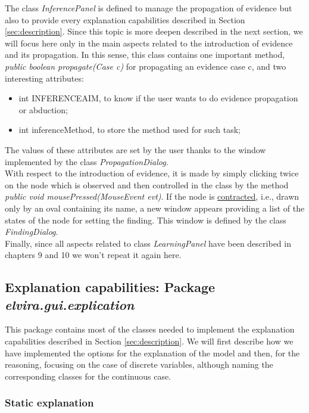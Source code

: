 The class \emph{InferencePanel} is defined to manage the
propagation of evidence but also to provide every explanation
capabilities described in Section \ref{sec:description}. Since
this topic is more deepen described in the next section, we will
focus here only in the main aspects related to the introduction of
evidence and its propagation. In this sense, this class contains
one important method, \emph{public boolean propagate(Case c)} for
propagating an evidence case c, and two interesting attributes:
\begin{itemize}
  \item int INFERENCEAIM, to know if the user wants to do evidence
  propagation or abduction;
  \item int inferenceMethod, to store the method used for such
  task;
\end{itemize}
The values of these attributes are set by the user thanks to the
window implemented by the class \emph{PropagationDialog}.\\

With respect to the introduction of evidence, it is made by simply
clicking twice on the node which is observed and then controlled
in the class by the method \emph{public void
mousePressed(MouseEvent evt)}. If the node is
\underline{contracted}, i.e., drawn only by an oval containing its
name, a new window appears providing a list of the states of the
node for setting the finding. This window is
defined by the class \emph{FindingDialog}.\\

Finally, since all aspects related to class \emph{LearningPanel}
have been described in chapters 9 and 10 we won't repeat it again
here.

\subsection{Explanation capabilities: Package \emph{elvira.gui.explication}}
\label{sec:impexplanation}

This package contains most of the classes needed to implement the
explanation capabilities described in Section
\ref{sec:description}. We will first describe how we have
implemented the options for the explanation of the model and then,
for the reasoning, focusing on the case of discrete variables,
although naming the corresponding classes for the continuous case.


\subsubsection{Static explanation}

